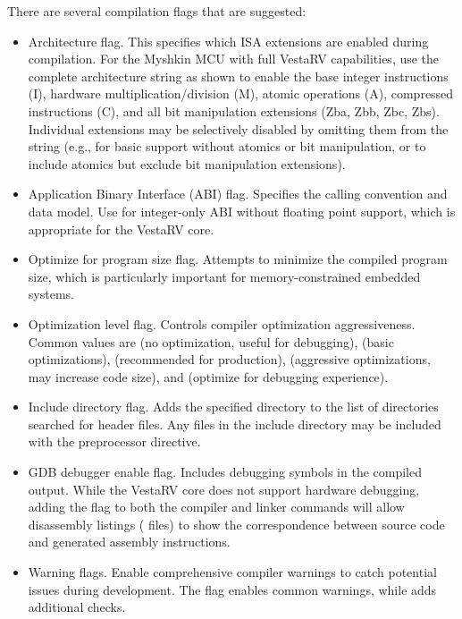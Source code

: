 \documentclass[11pt,pdftex,portrait,letterpaper]{article}
\begin{document}
There are several compilation flags that are suggested:
\begin{itemize}
\item {} Architecture flag. This specifies which ISA extensions are enabled during compilation. For the Myshkin MCU with full VestaRV capabilities, use the complete architecture string as shown to enable the base integer instructions (I), hardware multiplication/division (M), atomic operations (A), compressed instructions (C), and all bit manipulation extensions (Zba, Zbb, Zbc, Zbs). Individual extensions may be selectively disabled by omitting them from the string (e.g.,  for basic support without atomics or bit manipulation, or  to include atomics but exclude bit manipulation extensions).

\item {} Application Binary Interface (ABI) flag. Specifies the calling convention and data model. Use  for integer-only ABI without floating point support, which is appropriate for the VestaRV core.

\item {} Optimize for program size flag. Attempts to minimize the compiled program size, which is particularly important for memory-constrained embedded systems.

\item {} Optimization level flag. Controls compiler optimization aggressiveness. Common values are  (no optimization, useful for debugging),  (basic optimizations),  (recommended for production),  (aggressive optimizations, may increase code size), and  (optimize for debugging experience).

\item {} Include directory flag. Adds the specified directory to the list of directories searched for header files. Any files in the include directory may be included with the  preprocessor directive.

\item {} GDB debugger enable flag. Includes debugging symbols in the compiled output. While the VestaRV core does not support hardware debugging, adding the  flag to both the compiler and linker commands will allow disassembly listings ( files) to show the correspondence between source code and generated assembly instructions.

\item {} Warning flags. Enable comprehensive compiler warnings to catch potential issues during development. The  flag enables common warnings, while  adds additional checks.
\end{itemize}
\end{document}
